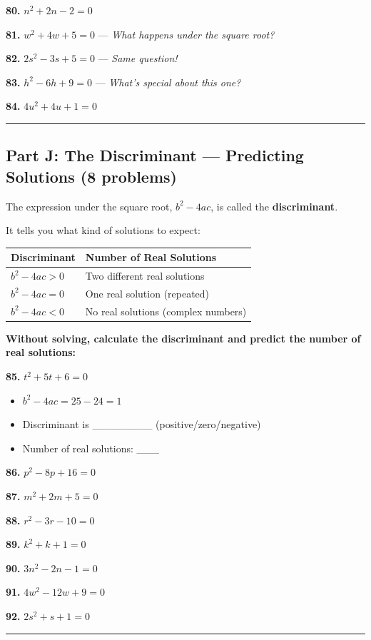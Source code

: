 \documentclass[
  11pt,
]{article}
\providecommand{\tightlist}{%
  \setlength{\itemsep}{0pt}\setlength{\parskip}{0pt}}
\begin{document}
\textbf{80.} \(n^2 + 2n - 2 = 0\)

\textbf{81.} \(w^2 + 4w + 5 = 0\) --- \emph{What happens under the
square root?}

\textbf{82.} \(2s^2 - 3s + 5 = 0\) --- \emph{Same question!}

\textbf{83.} \(h^2 - 6h + 9 = 0\) --- \emph{What's special about this
one?}

\textbf{84.} \(4u^2 + 4u + 1 = 0\)

\begin{center}\rule{0.5\linewidth}{0.5pt}\end{center}

\hypertarget{part-j-the-discriminant-predicting-solutions-8-problems}{%
\subsection{Part J: The Discriminant --- Predicting Solutions (8
problems)}\label{part-j-the-discriminant-predicting-solutions-8-problems}}

The expression under the square root, \(b^2 - 4ac\), is called the
\textbf{discriminant}.

It tells you what kind of solutions to expect:

\begin{longtable}[]{@{}ll@{}}
\toprule\noalign{}
Discriminant & Number of Real Solutions \\
\midrule\noalign{}
\endhead
\bottomrule\noalign{}
\endlastfoot
\(b^2 - 4ac > 0\) & Two different real solutions \\
\(b^2 - 4ac = 0\) & One real solution (repeated) \\
\(b^2 - 4ac < 0\) & No real solutions (complex numbers) \\
\end{longtable}

\textbf{Without solving, calculate the discriminant and predict the
number of real solutions:}

\textbf{85.} \(t^2 + 5t + 6 = 0\)

\begin{itemize}
\tightlist
\item
  \(b^2 - 4ac = 25 - 24 = 1\)
\item
  Discriminant is \_\_\_\_\_\_\_\_ (positive/zero/negative)
\item
  Number of real solutions: \_\_\_
\end{itemize}

\textbf{86.} \(p^2 - 8p + 16 = 0\)

\textbf{87.} \(m^2 + 2m + 5 = 0\)

\textbf{88.} \(r^2 - 3r - 10 = 0\)

\textbf{89.} \(k^2 + k + 1 = 0\)

\textbf{90.} \(3n^2 - 2n - 1 = 0\)

\textbf{91.} \(4w^2 - 12w + 9 = 0\)

\textbf{92.} \(2s^2 + s + 1 = 0\)

\begin{center}\rule{0.5\linewidth}{0.5pt}\end{center}
\end{document}
